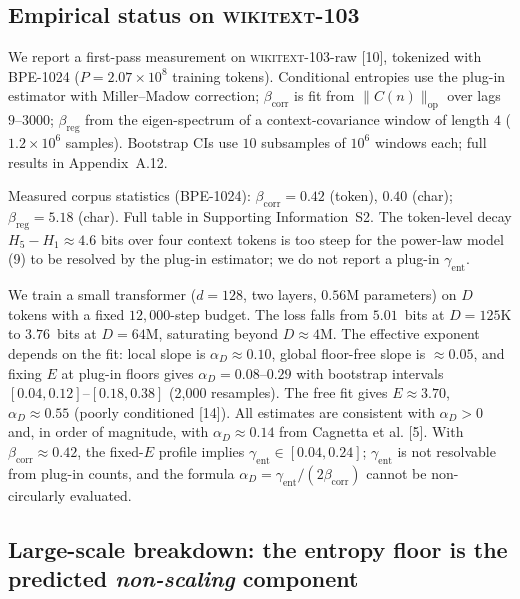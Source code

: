 \documentclass[12pt]{article}
\theoremstyle{remark}
\begin{document}
\subsection{Empirical status on \textsc{wikitext}-103}
\label{sec:empirical}

We report a first-pass measurement on \textsc{wikitext}-103-raw
[10], tokenized with BPE-1024 ($P=2.07\times10^8$ training
tokens). Conditional entropies use the plug-in estimator with Miller--Madow
correction; $\beta_{\mathrm{corr}}$ is fit from $\|C(n)\|_{\mathrm{op}}$ over lags
$9$--$3000$; $\beta_{\mathrm{reg}}$ from the eigen-spectrum of a context-covariance
window of length $4$ ($1.2\times10^6$ samples). Bootstrap CIs use $10$
subsamples of $10^6$ windows each; full results in
Appendix~A.12.

Measured corpus statistics (BPE-1024):
$\beta_{\mathrm{corr}}\!=\!0.42$ (token), $0.40$ (char);
$\beta_{\mathrm{reg}}\!=\!5.18$ (char).  Full table in Supporting Information~S2.
The token-level decay $H_5-H_1\!\approx\!4.6$ bits over four context tokens is
too steep for the power-law model (9) to be resolved by the
plug-in estimator; we do not report a plug-in $\gamma_{\mathrm{ent}}$.

We train a small transformer ($d=128$, two layers, $0.56$M parameters) on $D$
tokens with a fixed $12{,}000$-step budget. The loss falls from $5.01$~bits at
$D=125$K to $3.76$~bits at $D=64$M, saturating beyond $D\!\approx\!4$M. The
effective exponent depends on the fit: local slope is
$\alpha_D\!\approx\!0.10$, global floor-free slope is $\approx\!0.05$, and
fixing $E$ at plug-in floors gives $\alpha_D\!=\!0.08$--$0.29$ with bootstrap
intervals $[0.04,0.12]$--$[0.18,0.38]$ (2{,}000 resamples). The free fit gives
$E\!\approx\!3.70$, $\alpha_D\!\approx\!0.55$ (poorly conditioned
[14]). All estimates are consistent with $\alpha_D>0$ and, in
order of magnitude, with $\alpha_D\!\approx\!0.14$ from Cagnetta et al. [5].
With $\beta_{\mathrm{corr}}\!\approx\!0.42$, the fixed-$E$ profile implies
$\gamma_{\mathrm{ent}}\!\in\![0.04,0.24]$; $\gamma_{\mathrm{ent}}$ is not resolvable
from plug-in counts, and the formula $\alpha_D\!=\!\gamma_{\mathrm{ent}}/(2\beta_{\mathrm{corr}})$ cannot be non-circularly evaluated.

\subsection{Large-scale breakdown: the entropy floor is the predicted
\emph{non-scaling} component}
\label{sec:yan}
\end{document}
